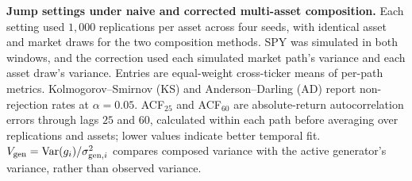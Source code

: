 \begin{table}[H]
  \centering
  \caption{\textbf{Jump settings under naive and corrected multi-asset
    composition.} Each setting used $1{,}000$ replications per asset
    across four seeds, with identical asset and market draws for the
    two composition methods. SPY was simulated in both windows,
    and the correction used each simulated market path's variance
    and each asset draw's variance. Entries are equal-weight
    cross-ticker means of per-path metrics.
    Kolmogorov--Smirnov (KS) and Anderson--Darling (AD) report
    non-rejection rates at $\alpha=0.05$. ACF$_{25}$ and ACF$_{60}$
    are absolute-return autocorrelation errors through lags $25$
    and $60$, calculated within each path before averaging over
    replications and assets; lower values indicate better
    temporal fit. $V_{\gen}=\Var(g_i)/\sigma_{\gen,i}^2$ compares
    composed variance with the active generator's variance, rather
    than observed variance.}
  \label{tab:jump_ablation}
  \footnotesize
  \setlength{\tabcolsep}{4pt}
  
\end{table}
